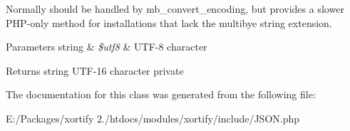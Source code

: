 Normally should be handled by mb\-\_\-convert\-\_\-encoding, but provides a slower P\-H\-P-\/only method for installations that lack the multibye string extension.


\begin{DoxyParams}[1]{Parameters}
string & {\em \$utf8} & U\-T\-F-\/8 character \\
\hline
\end{DoxyParams}
\begin{DoxyReturn}{Returns}
string U\-T\-F-\/16 character  private 
\end{DoxyReturn}


The documentation for this class was generated from the following file\-:\begin{DoxyCompactItemize}
\item 
E\-:/\-Packages/xortify 2./htdocs/modules/xortify/include/J\-S\-O\-N.\-php\end{DoxyCompactItemize}
